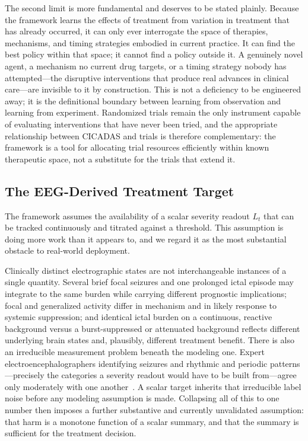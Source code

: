 The second limit is more fundamental and deserves to be stated plainly. Because the framework learns
the effects of treatment from variation in treatment that has already occurred, it can only ever
interrogate the space of therapies, mechanisms, and timing strategies embodied in current practice.
It can find the best policy within that space; it cannot find a policy outside it. A genuinely novel
agent, a mechanism no current drug targets, or a timing strategy nobody has attempted---the
disruptive interventions that produce real advances in clinical care---are invisible to it by
construction. This is not a deficiency to be engineered away; it is the definitional boundary
between learning from observation and learning from experiment. Randomized trials remain the only
instrument capable of evaluating interventions that have never been tried, and the appropriate
relationship between CICADAS and trials is therefore complementary: the framework is a tool for
allocating trial resources efficiently within known therapeutic space, not a substitute for the
trials that extend it.

\subsection{The EEG-Derived Treatment Target}
\label{sec:eeg-readout}

The framework assumes the availability of a scalar severity readout $L_t$ that can be tracked
continuously and titrated against a threshold. This assumption is doing more work than it appears
to, and we regard it as the most substantial obstacle to real-world deployment.

Clinically distinct electrographic states are not interchangeable instances of a single quantity.
Several brief focal seizures and one prolonged ictal episode may integrate to the same burden while
carrying different prognostic implications; focal and generalized activity differ in mechanism and
in likely response to systemic suppression; and identical ictal burden on a continuous, reactive
background versus a burst-suppressed or attenuated background reflects different underlying brain
states and, plausibly, different treatment benefit. There is also an irreducible measurement problem
beneath the modeling one. Expert electroencephalographers identifying seizures and rhythmic and
periodic patterns---precisely the categories a severity readout would have to be built
from---agree only moderately with one another~\cite{jing2023interrater}. A scalar target inherits
that irreducible label noise before any modeling assumption is made. Collapsing all of this to one
number then imposes a further substantive and currently unvalidated assumption: that harm is a
monotone function of a scalar summary, and that the summary is sufficient for the treatment
decision.

